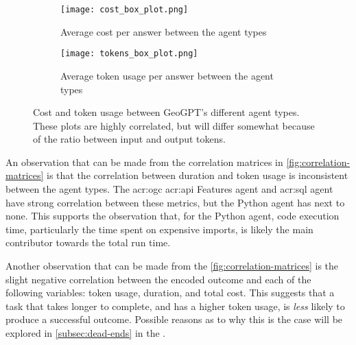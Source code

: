 \begin{figure}[htbp]
    \centering
    \begin{subfigure}[b]{0.48\textwidth}
        \centering
        \texttt{[image: cost\_box\_plot.png]}
        \caption{Average cost per answer between the agent types}
        \label{fig:cost-box-plot}
    \end{subfigure}
    \hfill
    \begin{subfigure}[b]{0.48\textwidth}
        \centering
        \texttt{[image: tokens\_box\_plot.png]}
        \caption{Average token usage per answer between the agent types}
        \label{fig:tokens-box-plot}
    \end{subfigure}
    \caption[Cost and token usage between GeoGPT's different agent types]{Cost and token usage between GeoGPT's different agent types. These plots are highly correlated, but will differ somewhat because of the ratio between input and output tokens.}
    \label{fig:cost-and-tokens}
\end{figure}

An observation that can be made from the correlation matrices in \autoref{fig:correlation-matrices} is that the correlation between duration and token usage is inconsistent between the agent types. The \acrshort{acr:ogc} \acrshort{acr:api} Features agent and \acrshort{acr:sql} agent have strong correlation between these metrics, but the Python agent has next to none. This supports the observation that, for the Python agent, code execution time, particularly the time spent on expensive imports, is likely the main contributor towards the total run time.

Another observation that can be made from the \autoref{fig:correlation-matrices} is the slight negative correlation between the encoded outcome and each of the following variables: token usage, duration, and total cost. This suggests that a task that takes longer to complete, and has a higher token usage, is \textit{less} likely to produce a successful outcome. Possible reasons as to why this is the case will be explored in \autoref{subsec:dead-ends} in the .

